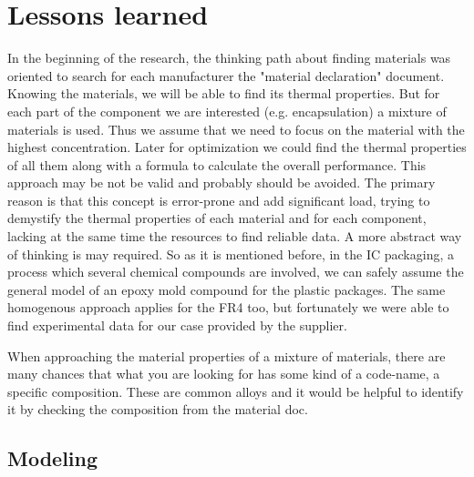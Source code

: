 \documentclass[final]{cubedoc}
\begin{document}
\section{Lessons learned}\label{lessons_learned}

In the beginning of the research, the thinking path about finding materials was oriented to search for each manufacturer the "material declaration" document. Knowing the materials, we will be able to find its thermal properties. But for each part of the component we are interested (e.g. encapsulation) a mixture of materials is used. Thus we assume that we need to focus on the material with the highest concentration. Later for optimization we could find the thermal properties of all them along with a formula to calculate the overall performance. This approach may be not be valid and probably should be avoided. The primary reason is that this concept is error-prone and add significant load, trying to demystify the thermal properties of each material and for each component, lacking at the same time the resources to find reliable data. A more abstract way of thinking is may required. So as it is mentioned before, in the IC packaging, a process which several chemical compounds are involved, we can safely assume the general model of an epoxy mold compound for the plastic packages. The same homogenous approach applies for the FR4 too, but fortunately we were able to find experimental data for our case provided by the supplier.


When approaching the material properties of a mixture of materials, there are many chances that what you are looking for has some kind of a code-name, a specific composition. These are common alloys and it would be helpful to identify it by checking the composition from the material doc. 


\subsection{Modeling}
\end{document}
